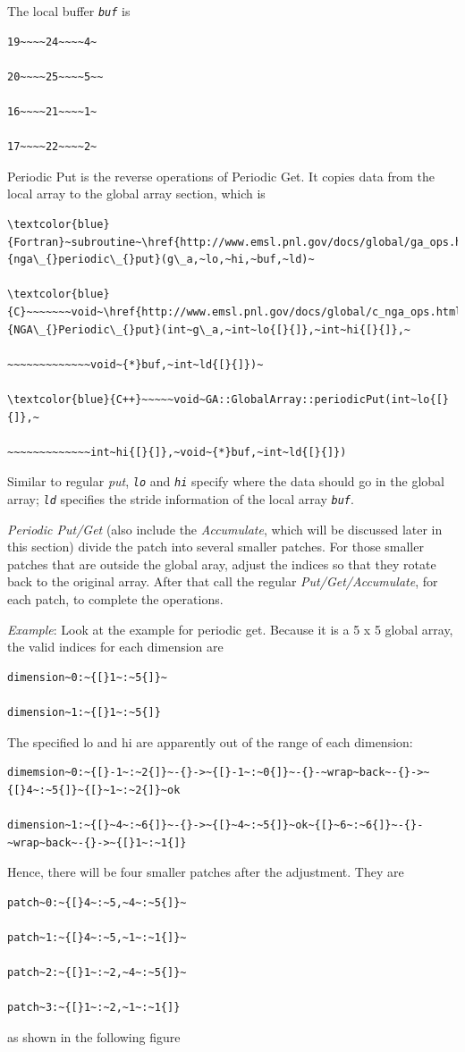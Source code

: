 The local buffer \texttt{\emph{buf}} is
\begin{verbatim}
19~~~~24~~~~4~

20~~~~25~~~~5~~

16~~~~21~~~~1~

17~~~~22~~~~2~
\end{verbatim}
Periodic Put is the reverse operations of Periodic Get. It copies
data from the local array to the global array section, which is
\begin{verbatim}
\textcolor{blue}{Fortran}~subroutine~\href{http://www.emsl.pnl.gov/docs/global/ga_ops.html\#ga_periodic_put}{nga\_{}periodic\_{}put}(g\_a,~lo,~hi,~buf,~ld)~

\textcolor{blue}{C}~~~~~~~void~\href{http://www.emsl.pnl.gov/docs/global/c_nga_ops.html\#ga_periodic_put}{NGA\_{}Periodic\_{}put}(int~g\_a,~int~lo{[}{]},~int~hi{[}{]},~

~~~~~~~~~~~~~void~{*}buf,~int~ld{[}{]})~

\textcolor{blue}{C++}~~~~~void~GA::GlobalArray::periodicPut(int~lo{[}{]},~

~~~~~~~~~~~~~int~hi{[}{]},~void~{*}buf,~int~ld{[}{]})
\end{verbatim}
Similar to regular\emph{ put}, \texttt{\emph{lo}} and \texttt{\emph{hi}}
specify where the data should go in the global array; \texttt{\emph{ld}}
specifies the stride information of the local array \texttt{\emph{buf}}.

\emph{Periodic Put/Get} (also include the \emph{Accumulate}, which
will be discussed later in this section) divide the patch into several
smaller patches. For those smaller patches that are outside the global
aray, adjust the indices so that they rotate back to the original
array. After that call the regular \emph{Put/Get/Accumulate}, for
each patch, to complete the operations.

\emph{Example}: Look at the example for periodic get. Because it is
a 5 x 5 global array, the valid indices for each dimension are
\begin{verbatim}
dimension~0:~{[}1~:~5{]}~

dimension~1:~{[}1~:~5{]}
\end{verbatim}
The specified lo and hi are apparently out of the range of each dimension:
\begin{verbatim}
dimemsion~0:~{[}-1~:~2{]}~-{}->~{[}-1~:~0{]}~-{}-~wrap~back~-{}->~{[}4~:~5{]}~{[}~1~:~2{]}~ok

dimension~1:~{[}~4~:~6{]}~-{}->~{[}~4~:~5{]}~ok~{[}~6~:~6{]}~-{}-~wrap~back~-{}->~{[}1~:~1{]}
\end{verbatim}
Hence, there will be four smaller patches after the adjustment. They
are
\begin{verbatim}
patch~0:~{[}4~:~5,~4~:~5{]}~

patch~1:~{[}4~:~5,~1~:~1{]}~

patch~2:~{[}1~:~2,~4~:~5{]}~

patch~3:~{[}1~:~2,~1~:~1{]}
\end{verbatim}
as shown in the following figure

